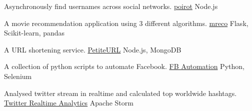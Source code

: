 

\begin{cventries}

  \cventry
    {Asynchronously find usernames across social networks.} %
    {\href{https://github.com/rajdeepbharati/poirot}{poirot}} %
    {Node.js} %
    {} %
    {}
    \vspace{-\baselineskip}

\begin{comment}
  \cventry
    {A music streaming and recommendation service.} %
    {\href{https://github.com/rajdeepbharati/Melodie}{Melodie}} %
    {Django, Scikit-learn, pandas} %
    {} %
    {}
    \vspace{-\baselineskip}
\end{comment}
  \cventry
    {A movie recommendation application using 3 different algorithms.} %
    {\href{https://mreco.herokuapp.com}{mreco}} %
    {Flask, Scikit-learn, pandas} %
    {} %
    {}
    \vspace{-\baselineskip}
    
  \cventry
    {A URL shortening service.} %
    {\href{https://github.com/rajdeepbharati/PetiteURL}{PetiteURL}} %
    {Node.js, MongoDB} %
    {} %
    {}
    \vspace{-\baselineskip}
    
  \cventry
    {A collection of python scripts to automate Facebook.} %
    {\href{https://github.com/rajdeepbharati/FB-Automation}{FB Automation}} %
    {Python, Selenium} %
    {} %
    {}
    \vspace{-\baselineskip}

  \cventry
    {Analysed twitter stream in realtime and calculated top worldwide
hashtags.} %
    {\href{https://github.com/rajdeepbharati/Twitter-Realtime-Analytics}{Twitter Realtime Analytics}} %
    {Apache Storm} %
    {} %
    {}
    \vspace{-\baselineskip}


\end{cventries}
